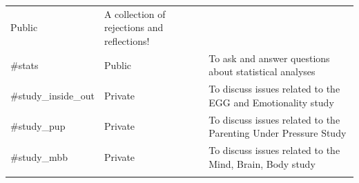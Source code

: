 \documentclass[]{book}
\begin{document}
\begin{longtable}[]{@{}lll@{}}
\begin{minipage}[t]{0.05\columnwidth}
Public\strut
\end{minipage} & \begin{minipage}[t]{0.69\columnwidth}\raggedright\strut
A collection of rejections and reflections!\strut
\end{minipage}\tabularnewline
\begin{minipage}[t]{0.18\columnwidth}\raggedright\strut
\#stats\strut
\end{minipage} & \begin{minipage}[t]{0.05\columnwidth}\raggedright\strut
Public\strut
\end{minipage} & \begin{minipage}[t]{0.69\columnwidth}\raggedright\strut
To ask and answer questions about statistical analyses\strut
\end{minipage}\tabularnewline
\begin{minipage}[t]{0.18\columnwidth}\raggedright\strut
\#study\_inside\_out\strut
\end{minipage} & \begin{minipage}[t]{0.05\columnwidth}\raggedright\strut
Private\strut
\end{minipage} & \begin{minipage}[t]{0.69\columnwidth}\raggedright\strut
To discuss issues related to the EGG and Emotionality study\strut
\end{minipage}\tabularnewline
\begin{minipage}[t]{0.18\columnwidth}\raggedright\strut
\#study\_pup\strut
\end{minipage} & \begin{minipage}[t]{0.05\columnwidth}\raggedright\strut
Private\strut
\end{minipage} & \begin{minipage}[t]{0.69\columnwidth}\raggedright\strut
To discuss issues related to the Parenting Under Pressure Study\strut
\end{minipage}\tabularnewline
\begin{minipage}[t]{0.18\columnwidth}\raggedright\strut
\#study\_mbb\strut
\end{minipage} & \begin{minipage}[t]{0.05\columnwidth}\raggedright\strut
Private\strut
\end{minipage} & \begin{minipage}[t]{0.69\columnwidth}\raggedright\strut
To discuss issues related to the Mind, Brain, Body study\strut
\end{minipage}\tabularnewline
\begin{minipage}[t]{0.18\columnwidth}\raggedright\strut

\end{minipage}
\end{longtable}
\end{document}
